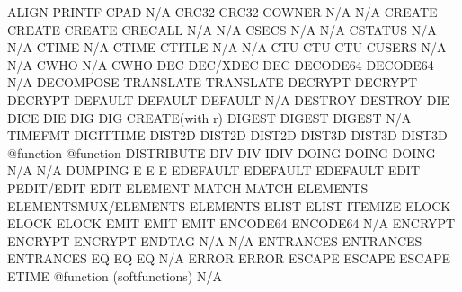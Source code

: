 \documentclass[letterpaper,10pt,english]{sphinxmanual}
\begin{document}
\begin{sphinxVerbatim}[commandchars=\\\{\}]
ALIGN                   PRINTF                       CPAD
N/A                     CRC32                        CRC32
COWNER                  N/A                          N/A
CREATE                  CREATE                       CREATE
CRECALL                 N/A                          N/A
CSECS                   N/A                          N/A
CSTATUS                 N/A                          N/A
CTIME                   N/A                          CTIME
CTITLE                  N/A                          N/A
CTU                     CTU                          CTU
CUSERS                  N/A                          N/A
CWHO                    N/A                          CWHO
DEC                     DEC/XDEC                     DEC
DECODE64                DECODE64                     N/A
DECOMPOSE               TRANSLATE                    TRANSLATE
DECRYPT                 DECRYPT                      DECRYPT
DEFAULT                 DEFAULT                      DEFAULT
N/A                     DESTROY                      DESTROY
DIE                     DICE                         DIE
DIG                     DIG                          CREATE(with \PYGZsq{}r\PYGZsq{})
DIGEST                  DIGEST                       DIGEST
N/A                     TIMEFMT                      DIGITTIME
DIST2D                  DIST2D                       DIST2D
DIST3D                  DIST3D                       DIST3D
@function               @function                    DISTRIBUTE
DIV                     DIV                          IDIV
DOING                   DOING                        DOING
N/A                     N/A                          DUMPING
E                       E                            E
EDEFAULT                EDEFAULT                     EDEFAULT
EDIT                    PEDIT/EDIT                   EDIT
ELEMENT                 MATCH                        MATCH
ELEMENTS                ELEMENTSMUX/ELEMENTS         ELEMENTS
ELIST                   ELIST                        ITEMIZE
ELOCK                   ELOCK                        ELOCK
EMIT                    EMIT                         EMIT
ENCODE64                ENCODE64                     N/A
ENCRYPT                 ENCRYPT                      ENCRYPT
ENDTAG                  N/A                          N/A
ENTRANCES               ENTRANCES                    ENTRANCES
EQ                      EQ                           EQ
N/A                     ERROR                        ERROR
ESCAPE                  ESCAPE                       ESCAPE
ETIME                   @function (softfunctions)    N/A

\end{sphinxVerbatim}
\end{document}
